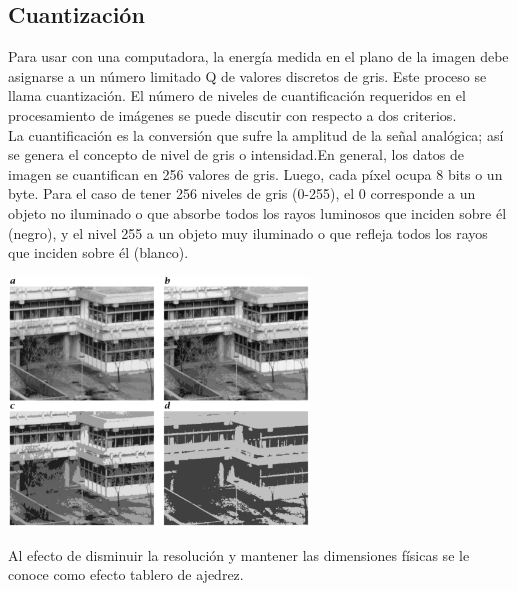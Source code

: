 \subsection{Cuantización}
Para usar con una computadora, la energía medida en el plano de la imagen debe 
asignarse a un número limitado Q de valores discretos de gris. Este proceso se llama 
cuantización. El número de niveles de cuantificación requeridos en el procesamiento de 
imágenes se puede discutir con respecto a dos criterios.\cite{Richard2011}\\
La cuantificación es la conversión
que sufre la amplitud de la señal analógica; así se genera el concepto de nivel de gris o
intensidad.En general, los datos de imagen se cuantifican en 256 valores de gris. 
Luego, cada píxel ocupa 8 bits o un byte. Para el caso de tener 256 niveles de gris (0-255), el 0 corresponde a un
objeto no iluminado o que absorbe todos los rayos luminosos que inciden sobre él
(negro), y el nivel 255 a un objeto muy iluminado o que refleja todos los rayos que
inciden sobre él (blanco).
\begin{center}
    \includegraphics[width=0.6\textwidth]{Capitulo2/Fig9.eps}
    \label{Fig9}
\end{center}
Al efecto de disminuir la resolución y mantener las
dimensiones físicas se le conoce como efecto tablero de ajedrez.


